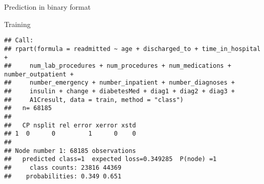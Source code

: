 \documentclass[]{article}
\newenvironment{Shaded}{\begin{snugshade}}{\end{snugshade}}
\newcommand{\KeywordTok}[1]{\textcolor[rgb]{0.13,0.29,0.53}{\textbf{#1}}}
\newcommand{\DataTypeTok}[1]{\textcolor[rgb]{0.13,0.29,0.53}{#1}}
\newcommand{\DecValTok}[1]{\textcolor[rgb]{0.00,0.00,0.81}{#1}}
\newcommand{\StringTok}[1]{\textcolor[rgb]{0.31,0.60,0.02}{#1}}
\newcommand{\OperatorTok}[1]{\textcolor[rgb]{0.81,0.36,0.00}{\textbf{#1}}}
\newcommand{\NormalTok}[1]{#1}
\begin{document}
Prediction in binary format

Training

\begin{Shaded}
\end{Shaded}

\begin{verbatim}
## Call:
## rpart(formula = readmitted ~ age + discharged_to + time_in_hospital + 
##     num_lab_procedures + num_procedures + num_medications + number_outpatient + 
##     number_emergency + number_inpatient + number_diagnoses + 
##     insulin + change + diabetesMed + diag1 + diag2 + diag3 + 
##     A1Cresult, data = train, method = "class")
##   n= 68185 
## 
##   CP nsplit rel error xerror xstd
## 1  0      0         1      0    0
## 
## Node number 1: 68185 observations
##   predicted class=1  expected loss=0.349285  P(node) =1
##     class counts: 23816 44369
##    probabilities: 0.349 0.651
\end{verbatim}
\end{document}
